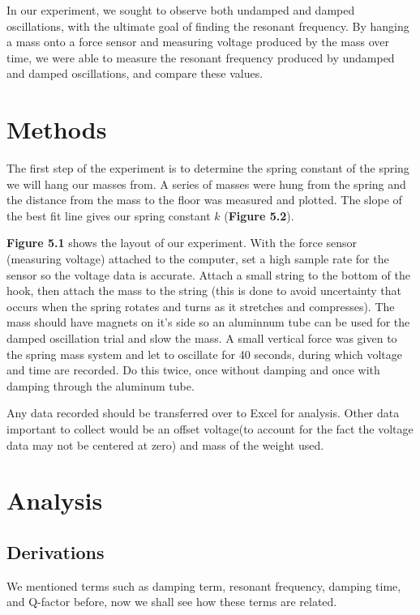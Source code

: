 \documentclass[11pt]{report}
\begin{document}
In our experiment, we sought to observe both undamped and damped oscillations,
with the ultimate goal of finding the resonant frequency.  By hanging a mass
onto a force sensor and measuring voltage produced by the mass over time,
we were able to measure the resonant frequency produced by undamped and damped
oscillations, and compare these values.

\section*{Methods}


The first step of the experiment is to determine the spring constant of the
spring we will hang our masses from.  A series of masses were hung from the
spring and the distance from the mass to the floor was measured and plotted.
The slope of the best fit line gives our spring constant \(k\) (\textbf{Figure
5.2}). 

\textbf{Figure 5.1} shows the layout of our experiment. 
With the force sensor (measuring voltage) attached to the computer, set a high sample
rate for the sensor so the voltage data is accurate.  Attach a small string to the
bottom of the hook, then attach the mass to the string (this is done to avoid
uncertainty that occurs when the spring rotates and turns as it stretches and
compresses).  The mass should have magnets on it's side so an aluminnum tube can
be used for the damped oscillation trial and slow the mass.  A small vertical force was
given to the spring mass system and let to oscillate for 40 seconds, during
which voltage and time are recorded. Do this twice, once without damping and
once with damping through the aluminum tube.

Any data recorded should be transferred over to Excel for analysis.  Other data
important to collect would be an offset voltage(to account for the fact the
voltage data may not be centered at zero) and mass of the weight used.  

\section*{Analysis}

\subsection*{Derivations}
We mentioned terms such as damping term, resonant frequency, damping time, and
Q-factor before, now we shall see how these terms are related.
\end{document}
